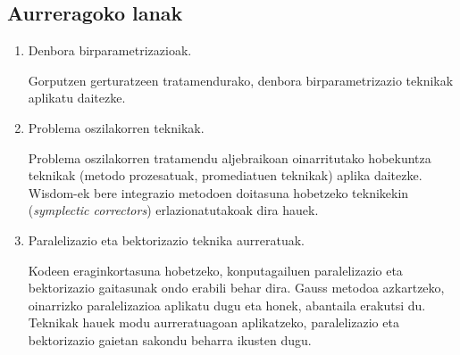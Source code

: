 \subsection*{Aurreragoko lanak}


\begin{enumerate}


\item Denbora birparametrizazioak.

Gorputzen gerturatzeen tratamendurako, denbora birparametrizazio teknikak aplikatu daitezke. 

\item Problema oszilakorren teknikak.

Problema oszilakorren tratamendu aljebraikoan oinarritutako hobekuntza teknikak (metodo prozesatuak, promediatuen teknikak) aplika daitezke.
Wisdom-ek \cite{Wisdom2006} bere integrazio metodoen doitasuna hobetzeko teknikekin (\emph{symplectic correctors}) erlazionatutakoak dira hauek.

 
\item Paralelizazio eta bektorizazio teknika aurreratuak.

Kodeen eraginkortasuna hobetzeko, konputagailuen paralelizazio eta bektorizazio gaitasunak ondo erabili behar dira. Gauss metodoa azkartzeko, oinarrizko paralelizazioa aplikatu dugu eta honek, abantaila erakutsi du. Teknikak hauek modu aurreratuagoan aplikatzeko,  paralelizazio eta bektorizazio gaietan sakondu beharra ikusten dugu. 


\end{enumerate} 








